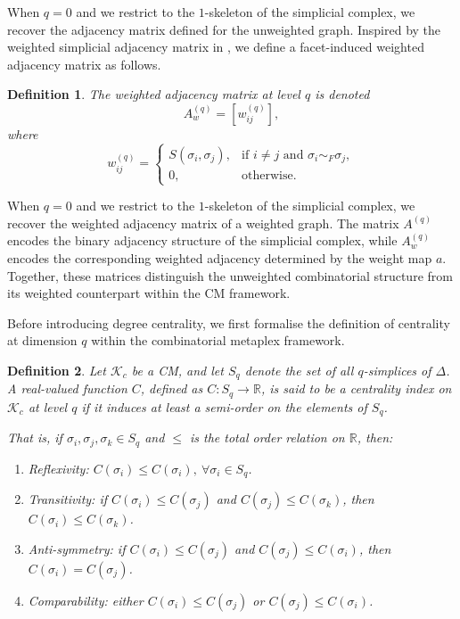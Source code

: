 \documentclass[12pt]{article}
\theoremstyle{normalhead_nobrackets}
\newtheorem{definition}{Definition}[section]
\theoremstyle{exampstyle}
\begin{document}
When $q=0$ and we restrict to the $1$-skeleton of the simplicial complex, we recover the adjacency matrix defined for the unweighted graph. Inspired by the weighted simplicial adjacency matrix in \cite{raj2025study}, we define a facet-induced weighted adjacency matrix as follows.
\begin{definition}
The {weighted adjacency matrix} at level $q$ is denoted
\[
A_w^{(q)} = [w_{ij}^{(q)}],
\]
where
\[
w_{ij}^{(q)} =
\begin{cases}
S(\sigma_i, \sigma_j), & \text{if } i \neq j \text{ and } \sigma_i \sim_F \sigma_j, \\
0, & \text{otherwise}.
\end{cases}
\]
\end{definition}

When $q=0$ and we restrict to the $1$-skeleton of the simplicial complex, we recover the weighted adjacency matrix of a weighted graph. The matrix $A^{(q)}$ encodes the binary adjacency structure of the simplicial complex, while $A_w^{(q)}$ encodes the corresponding weighted adjacency determined by the weight map $a$. Together, these matrices distinguish the unweighted combinatorial structure from its weighted counterpart within the CM framework.


Before introducing degree centrality, we first formalise the definition of centrality at dimension $q$ within the combinatorial metaplex framework.


\begin{definition}
Let $\mathcal{K}_c$ be a CM, and let $S_q$ denote the set of all $q$-simplices of $\Delta$. A real-valued function $C$, defined as \(C : S_q \to \mathbb{R}\), is said to be a centrality index on $\mathcal{K}_c$ at level $q$ if it induces at least a semi-order on the elements of $S_q$.

\noindent That is, if $\sigma_i, \sigma_j, \sigma_k \in S_q$ and $\le$ is the total order relation on $\mathbb{R}$, then:
\begin{enumerate}
    \item[(i)] Reflexivity: $C(\sigma_i) \le C(\sigma_i),\ \forall \sigma_i \in S_q$.
    \item[(ii)] Transitivity: if $C(\sigma_i) \le C(\sigma_j)$ and $C(\sigma_j) \le C(\sigma_k)$, then $C(\sigma_i) \le C(\sigma_k)$.
    \item[(iii)] Anti-symmetry: if $C(\sigma_i) \le C(\sigma_j)$ and $C(\sigma_j) \le C(\sigma_i)$, then $C(\sigma_i) = C(\sigma_j)$.
    \item[(iv)] Comparability: either $C(\sigma_i) \le C(\sigma_j)$ or $C(\sigma_j) \le C(\sigma_i)$.
\end{enumerate}
\end{definition}
\end{document}
